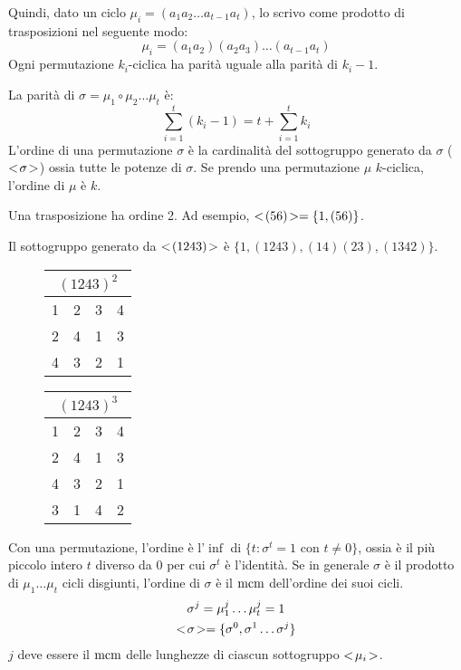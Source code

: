 Quindi, dato un ciclo $\mu_i = (a_1 a_2 \dots a_{t-1} a_t)$, lo scrivo come prodotto di trasposizioni nel seguente modo:
\[
\mu_i = (a_1 a_2) (a_2 a_3) \dots (a_{t-1} a_t)
\]
Ogni permutazione $k_i$-ciclica ha parit\`a uguale alla parit\`a di $k_i - 1$.

La parit\`a di $\sigma = \mu_1 \circ \mu_2 \ldots \mu_t$ \`e:
\[
\sum_{i = 1}^{t} (k_i - 1) = t + \sum_{i = 1}^{t} k_i
\]
L'ordine di una permutazione $\sigma$ \`e la cardinalit\`a del sottogruppo generato da $\sigma$ ($<\!{\sigma}\!>$) ossia tutte le potenze di $\sigma$. Se prendo una permutazione $\mu$ $k$-ciclica, l'ordine di $\mu$ \`e $k$.

Una trasposizione ha ordine 2. Ad esempio, $<\!{(5 6)}\!> = \{ 1, (5 6) \}$.

Il sottogruppo generato da $<\!{(1 2 4 3)}\!>$ \`e $ \{ 1, (1 2 4 3), (1 4) (2 3), (1 3 4 2) \}$.

\begin{figure}[ht]
\centering
\begin{tabular}{*{4}{c}}
\multicolumn{4}{c}{$(1 2 4 3)^2$} \\
\hline
1 & 2 & 3 & 4 \\
2 & 4 & 1 & 3 \\
4 & 3 & 2 & 1
\end{tabular}
\qquad
\begin{tabular}{*{4}{c}}
\multicolumn{4}{c}{$(1 2 4 3)^3$} \\
\hline
1 & 2 & 3 & 4 \\
2 & 4 & 1 & 3 \\
4 & 3 & 2 & 1 \\
3 & 1 & 4 & 2
\end{tabular}
\end{figure}

Con una permutazione, l'ordine \`e l'$\inf$ di $ \{ t : \sigma^t = 1 \text{ con } t \neq 0 \}$, ossia \`e il pi\`u piccolo intero $t$ diverso da 0 per cui $\sigma^t$ \`e l'identit\`a. Se in generale $\sigma$ \`e il prodotto di $\mu_1 \dots \mu_t$ cicli disgiunti, l'ordine di $\sigma$ \`e il $\operatorname{mcm}$ dell'ordine dei suoi cicli.
\begin{gather*}
\sigma^j = \mu_1^j \dots \mu_t^j = 1 \\
<\!{\sigma}\!> = \{ \sigma^0, \sigma^1 \dots \sigma^j \}
\end{gather*}
$j$ deve essere il $\operatorname{mcm}$ delle lunghezze di ciascun sottogruppo $<\!{\mu_i}\!>$.

